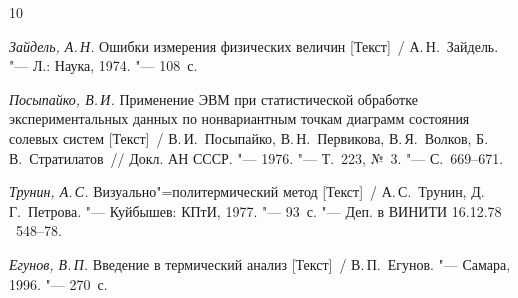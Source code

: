 \begin{thebibliography}{10}
\item \textit{Зайдель, А.\,Н.} Ошибки измерения физических величин [Текст]~/  А.\,Н.~Зайдель. "---  Л.: Наука, 1974. "--- 108~с.



\item \textit{Посыпайко, В.\,И.} Применение ЭВМ при статистической обработке экспериментальных данных по нонвариантным точкам диаграмм состояния солевых систем [Текст]~/  
В.\,И.~Посыпайко, В.\,Н.~Первикова, В.\,Я.~Волков, Б.\,В.~Стратилатов~/\!/
Докл. АН СССР. "--- 1976. "--- Т.~223, №~3. "--- С.~669--671.



\item \textit{Трунин, А.\,С.} Визуально"=политермический метод [Текст]~/
А.\,С.~Трунин, Д.\,Г.~Петрова. "--- Куйбышев: КПтИ, 1977. "--- 93~с. "--- Деп. в ВИНИТИ 16.12.78 \No~548--78.


\item \textit{Егунов, В.\,П.} Введение в термический анализ [Текст]~/
В.\,П.~Егунов. "---  Самара, 1996. "--- 270~с.
\end{thebibliography}


\vspace{10mm}

\makeengtitle


%
